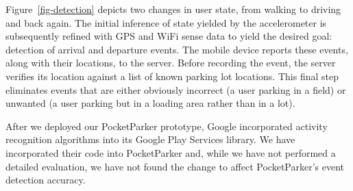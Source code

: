 Figure~\ref{fig-detection} depicts two changes in user state, from walking to
driving and back again.  The initial inference of state yielded by the
accelerometer is subsequently refined with GPS and WiFi sense data to yield
the desired goal:  detection of arrival and departure events.  The mobile
device reports these events, along with their locations, to the server.
Before recording the event, the server verifies its location against a list
of known parking lot locations.  This final step eliminates events that are
either obviously incorrect (a user parking in a field) or unwanted (a user
parking but in a loading area rather than in a lot).

After we deployed our PocketParker prototype, Google incorporated activity
recognition algorithms into its Google Play Services library. We have
incorporated their code into PocketParker and, while we have not performed a
detailed evaluation, we have not found the change to affect PocketParker's
event detection accuracy.

